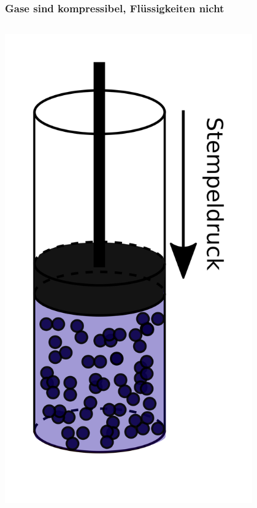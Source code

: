\documentclass{beamer}
\begin{document}
\begin{frame}
\frametitle{Gase sind kompressibel, Flüssigkeiten nicht}

\begin{columns}[c]

\begin{column}{5cm}
\begin{center}
\includegraphics[width=0.8\textwidth]{stempeldruck_fluessigkeit_2.png}
\end{center}
\end{column}


\end{columns}
\end{frame}
\end{document}
